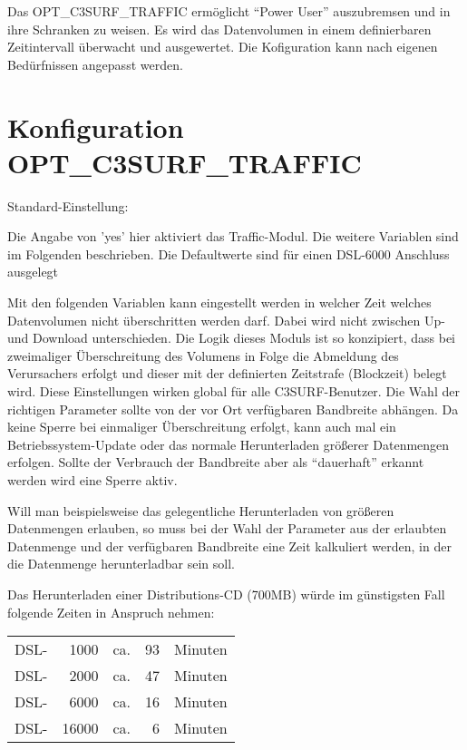   Das OPT\_C3SURF\_TRAFFIC ermöglicht ``Power User'' auszubremsen und in ihre Schranken zu weisen.
  Es wird das Datenvolumen in einem definierbaren Zeitintervall überwacht und ausgewertet. Die 
  Kofiguration kann nach eigenen Bedürfnissen angepasst werden.

\section {Konfiguration OPT\_C3SURF\_TRAFFIC}

\begin{description}

   
  Standard-Einstellung: 
   
  Die Angabe von 'yes' hier aktiviert das Traffic-Modul. Die weitere Variablen sind im
  Folgenden beschrieben. Die Defaultwerte sind für einen DSL-6000 Anschluss ausgelegt
   
  Mit den folgenden Variablen kann eingestellt werden in welcher Zeit welches Datenvolumen nicht überschritten
  werden darf. Dabei wird nicht zwischen Up- und Download unterschieden. Die Logik dieses Moduls ist so konzipiert,
  dass bei zweimaliger Überschreitung des Volumens in Folge die Abmeldung des Verursachers erfolgt und dieser mit
  der definierten Zeitstrafe (Blockzeit) belegt wird. Diese Einstellungen wirken global für alle C3SURF-Benutzer.
  Die Wahl der richtigen Parameter sollte von der vor Ort verfügbaren Bandbreite abhängen. Da keine Sperre bei
  einmaliger Überschreitung erfolgt, kann auch mal ein Betriebssystem-Update oder das normale Herunterladen größerer
  Datenmengen erfolgen. Sollte der Verbrauch der Bandbreite aber als ``dauerhaft'' erkannt werden wird eine
  Sperre aktiv.
   
  Will man beispielsweise das gelegentliche Herunterladen von größeren Datenmengen erlauben, so muss bei
  der Wahl der Parameter aus der erlaubten Datenmenge und der verfügbaren Bandbreite eine Zeit kalkuliert
  werden, in der die Datenmenge herunterladbar sein soll.


   Das Herunterladen einer Distributions-CD (700MB) würde im günstigsten
   Fall folgende Zeiten in Anspruch nehmen:
   
   \begin{tabular}{lrlrl}
    
    DSL-&1000 & ca.& 93 & Minuten \\
    DSL-&2000 & ca.& 47 & Minuten \\
    DSL-&6000 & ca.& 16 & Minuten \\
    DSL-&16000 & ca.& 6 & Minuten \\
    

\end{tabular}
\end{description}
